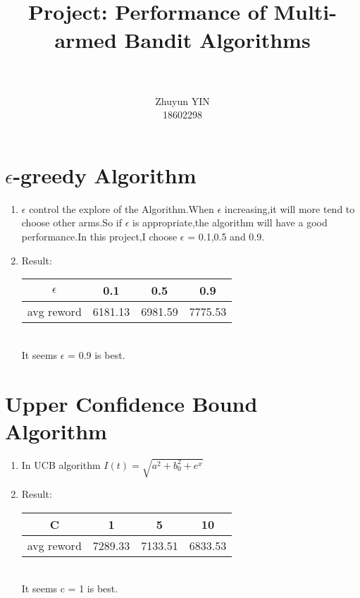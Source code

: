 \documentclass[paper=a4, fontsize=11pt]{scrartcl}
\title{
	\usefont{OT1}{bch}{b}{n}
	\horrule{0.5pt} \\[0.4cm]
	\huge Project: Performance of Multi-armed Bandit Algorithms \\
	\horrule{2pt} \\[0.5cm]
}
\author{
	\normalfont 								\normalsize
	Zhuyun YIN \\
	\normalsize 18602298\\[-3pt]		\normalsize
}
\date{}
\numberwithin{equation}{section}		%
\numberwithin{figure}{section}			%
\numberwithin{table}{section}				%
\begin{document}
	\maketitle
	
	\section{$\epsilon$-greedy Algorithm}
	
	\begin{enumerate}
		\item $\epsilon$ control the explore of the Algorithm.When $\epsilon$ increasing,it will more tend to choose other arms.So if $\epsilon$ is appropriate,the algorithm will have a good performance.In this project,I choose $\epsilon$ = 0.1,0.5 and 0.9.
		
		\item Result:\\
		\begin{tabular}{c|ccc}
		\hline
		$\epsilon$ & 0.1 & 0.5 & 0.9 \\ \hline
		avg reword  & 6181.13 & 6981.59 & 7775.53 \\ \hline
	    \end{tabular}\\
		It seems $\epsilon$ = 0.9 is best.
	\end{enumerate}
	
	\section{Upper Confidence Bound Algorithm}
	\begin{enumerate}
		\item In UCB algorithm $ I(t) = \sqrt{a^{2}+b_{0}^{2}+e^{x}} $
		
		\item Result:\\
		\begin{tabular}{c|ccc}
		\hline
		C & 1 & 5 & 10 \\ \hline
		avg reword  & 7289.33 & 7133.51  & 6833.53 \\ \hline
	    \end{tabular}\\
	    It seems c = 1 is best.
	\end{enumerate}
	
\end{document}

